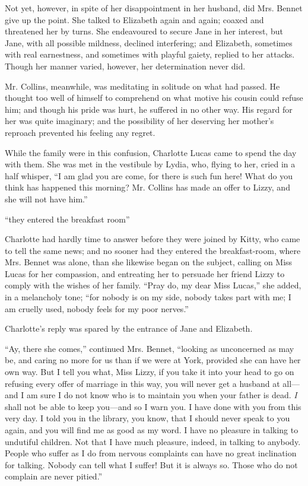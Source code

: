 \documentclass[12pt,openright]{book}
\begin{document}
Not yet, however, in spite of her disappointment in her husband, did Mrs. Bennet give up the point. She talked to Elizabeth again and again; coaxed and threatened her by turns. She endeavoured to secure Jane in her interest, but Jane, with all possible mildness, declined interfering; and Elizabeth, sometimes with real earnestness, and sometimes with playful gaiety, replied to her attacks. Though her manner varied, however, her determination never did.

Mr. Collins, meanwhile, was meditating in solitude on what had passed. He thought too well of himself to comprehend on what motive his cousin could refuse him; and though his pride was hurt, he suffered in no other way. His regard for her was quite imaginary; and the possibility of her deserving her mother’s reproach prevented his feeling any regret.

While the family were in this confusion, Charlotte Lucas came to spend the day with them. She was met in the vestibule by Lydia, who, flying to her, cried in a half whisper, “I am glad you are come, for there is such fun here! What do you think has happened this morning? Mr. Collins has made an offer to Lizzy, and she will not have him.”

“they entered the breakfast room”

Charlotte had hardly time to answer before they were joined by Kitty, who came to tell the same news; and no sooner had they entered the breakfast-room, where Mrs. Bennet was alone, than she likewise began on the subject, calling on Miss Lucas for her compassion, and entreating her to persuade her friend Lizzy to comply with the wishes of her family. “Pray do, my dear Miss Lucas,” she added, in a melancholy tone; “for nobody is on my side, nobody takes part with me; I am cruelly used, nobody feels for my poor nerves.”

Charlotte’s reply was spared by the entrance of Jane and Elizabeth.

“Ay, there she comes,” continued Mrs. Bennet, “looking as unconcerned as may be, and caring no more for us than if we were at York, provided she can have her own way. But I tell you what, Miss Lizzy, if you take it into your head to go on refusing every offer of marriage in this way, you will never get a husband at all—and I am sure I do not know who is to maintain you when your father is dead. \textit{I} shall not be able to keep you—and so I warn you. I have done with you from this very day. I told you in the library, you know, that I should never speak to you again, and you will find me as good as my word. I have no pleasure in talking to undutiful children. Not that I have much pleasure, indeed, in talking to anybody. People who suffer as I do from nervous complaints can have no great inclination for talking. Nobody can tell what I suffer! But it is always so. Those who do not complain are never pitied.”
\end{document}

